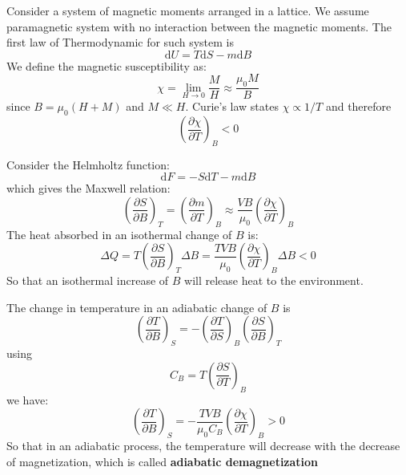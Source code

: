 \documentclass{article}
\newcommand{\pfrac}[2]{\frac{\partial #1}{\partial #2}}
\newcommand{\dnor}{\text{d}}
\begin{document}
Consider a system of magnetic moments arranged in a lattice. We 
assume paramagnetic system with no interaction between the magnetic moments. 
The first law of Thermodynamic for such system is 
\begin{equation}
    \dnor U = T \dnor S - m \dnor B
\end{equation}
We define the magnetic susceptibility as:
\begin{equation}
    \chi = \lim_{H\to0} \frac{M}{H} \approx \frac{\mu_0 M}{B}
\end{equation}
since $B = \mu_0(H+M)$ and $M \ll H$.
Curie's law states $\chi \propto 1/T$ and therefore
\begin{equation}
    \left(\pfrac{\chi}{T}\right)_B < 0
\end{equation}

Consider the Helmholtz function:
\begin{equation}
    \dnor F = - S \dnor T - m \dnor B
\end{equation}
which gives the Maxwell relation:
\begin{equation}
    \left(\pfrac{S}{B}\right)_T = \left(\pfrac{m}{T}\right)_B 
    \approx \frac{VB}{\mu_0} \left(\pfrac{\chi}{T}\right)_B
\end{equation}
The heat absorbed in an isothermal change of $B$ is:
\begin{equation}
    \Delta Q = T \left(\pfrac{S}{B}\right)_T \Delta B
    = \frac{TVB}{\mu_0} \left(\pfrac{\chi}{T}\right)_B \Delta B < 0
\end{equation}
So that an isothermal increase of $B$ will 
release heat to the environment.

The change in temperature in an adiabatic change of $B$ is 
\begin{equation}
    \left( \pfrac{T}{B} \right)_S = - \left( \pfrac{T}{S} \right)_B \left( \pfrac{S}{B} \right)_T
\end{equation}
using 
\begin{equation}
    C_B = T \left( \pfrac{S}{T} \right)_B    
\end{equation}
we have:
\begin{equation}
    \left( \pfrac{T}{B} \right)_S = - \frac{TVB}{\mu_0 C_B} \left(\pfrac{\chi}{T}\right)_B > 0
\end{equation}
So that in an adiabatic process, the temperature will decrease with the decrease of magnetization,
which is called \textbf{adiabatic demagnetization}
\end{document}
